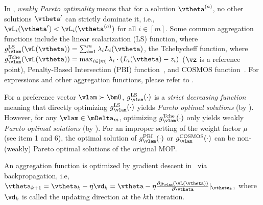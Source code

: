 In , \emph{weakly Pareto optimality} means that for a solution $\vtheta^{(a)}$, no other solutions $\vtheta'$ can strictly dominate it, i.e., $\vL_i(\vtheta') < \vL_i(\vtheta^{(a)})$ for all $i \in [m]$.
Some common aggregation functions include the linear scalarization (LS) function, where \( g_\vlam^\mathrm{LS}(\vL(\vtheta)) = \sum_{i=1}^m \lambda_i L_i(\vtheta) \), the Tchebycheff function, where \( g_\vlam^\mathrm{Tche}(\vL(\vtheta)) = \max_{i \in [m]} \lambda_i \cdot (L_i(\vtheta) - z_i)  \) ($\vz$ is a reference point), Penalty-Based Intersection (PBI) function~\cite{zhang2007moea}, and COSMOS function~\cite{ruchte2021scalable}. For expressions and other aggregation functions, please refer to . 

For a preference vector $\vlam \succ \bm 0$, $g_\vlam^\mathrm{LS}(\cdot)$ is a \emph{strict decreasing function} meaning that directly optimizing $g_\vlam^\mathrm{LS}(\cdot)$ yields \emph{Pareto optimal solutions} (by ). However, for any $\vlam \in \mDelta_m$, optimizing $g_\vlam^\mathrm{Tche}(\cdot)$ only yields weakly \emph{Pareto optimal solutions} (by ). For an improper setting of the weight factor $\mu$ (see  item 1 and 6), the optimal solution of $g_\vlam^\mathrm{PBI}(\cdot)$ or $g_\vlam^\mathrm{COSMOS}(\cdot)$ can be non-(weakly) Pareto optimal solutions of the original MOP. 

An aggregation function is optimized by gradient descent in \algoname~via backpropagation, i.e, 
$
     \vtheta_{k+1} = \vtheta_k - \eta \vd_k = \vtheta - \eta \frac{\partial g_\vlam(\vL(\vtheta))}{\partial \vtheta} |_{\vtheta_k},   
$
where $\vd_k$ is called the updating direction at the $k$th iteration.

